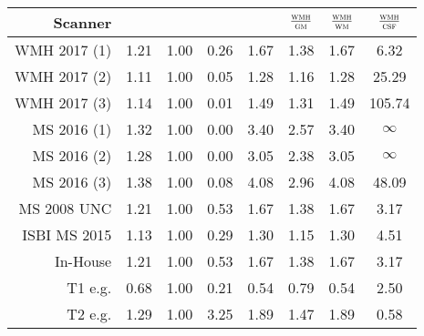 \begin{tabular}{rccccccc}
\toprule
Scanner & \gm{} & \wm{} & \csf{} & \wmh{} & $\frac{\textsc{wmh}}{\textsc{gm}}$ & $\frac{\textsc{wmh}}{\textsc{wm}}$ & $\frac{\textsc{wmh}}{\textsc{csf}}$ \\
\midrule
WMH 2017 (1) & 1.21 & 1.00 & 0.26 & 1.67 & 1.38 & 1.67 & 6.32 \\
WMH 2017 (2) & 1.11 & 1.00 & 0.05 & 1.28 & 1.16 & 1.28 & 25.29 \\
WMH 2017 (3) & 1.14 & 1.00 & 0.01 & 1.49 & 1.31 & 1.49 & 105.74 \\
MS  2016 (1) & 1.32 & 1.00 & 0.00 & 3.40 & 2.57 & 3.40 & $\infty$ \\
MS  2016 (2) & 1.28 & 1.00 & 0.00 & 3.05 & 2.38 & 3.05 & $\infty$ \\
MS  2016 (3) & 1.38 & 1.00 & 0.08 & 4.08 & 2.96 & 4.08 & 48.09 \\
MS  2008 UNC & 1.21 & 1.00 & 0.53 & 1.67 & 1.38 & 1.67 & 3.17 \\
ISBI MS 2015 & 1.13 & 1.00 & 0.29 & 1.30 & 1.15 & 1.30 & 4.51 \\
In-House & 1.21 & 1.00 & 0.53 & 1.67 & 1.38 & 1.67 & 3.17 \\
T1 e.g. & 0.68 & 1.00 & 0.21 & 0.54 & 0.79 & 0.54 & 2.50 \\
T2 e.g. & 1.29 & 1.00 & 3.25 & 1.89 & 1.47 & 1.89 & 0.58 \\
\bottomrule
\end{tabular}